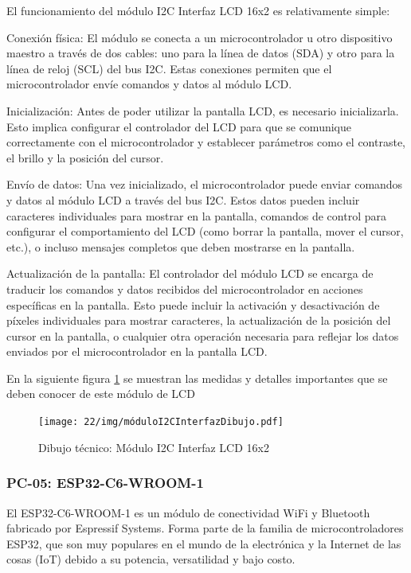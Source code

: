 El funcionamiento del módulo I2C Interfaz LCD 16x2 es relativamente simple:

Conexión física: El módulo se conecta a un microcontrolador u otro dispositivo maestro a través de dos cables: uno para la línea de datos (SDA) y otro para la línea de reloj (SCL) del bus I2C. Estas conexiones permiten que el microcontrolador envíe comandos y datos al módulo LCD.

Inicialización: Antes de poder utilizar la pantalla LCD, es necesario inicializarla. Esto implica configurar el controlador del LCD para que se comunique correctamente con el microcontrolador y establecer parámetros como el contraste, el brillo y la posición del cursor.

Envío de datos: Una vez inicializado, el microcontrolador puede enviar comandos y datos al módulo LCD a través del bus I2C. Estos datos pueden incluir caracteres individuales para mostrar en la pantalla, comandos de control para configurar el comportamiento del LCD (como borrar la pantalla, mover el cursor, etc.), o incluso mensajes completos que deben mostrarse en la pantalla.

Actualización de la pantalla: El controlador del módulo LCD se encarga de traducir los comandos y datos recibidos del microcontrolador en acciones específicas en la pantalla. Esto puede incluir la activación y desactivación de píxeles individuales para mostrar caracteres, la actualización de la posición del cursor en la pantalla, o cualquier otra operación necesaria para reflejar los datos enviados por el microcontrolador en la pantalla LCD.

En la siguiente figura \ref{fig:modulo} se muestran las medidas y detalles importantes que se deben conocer de este módulo de LCD
\begin{figure}[H]
    \centering
    \texttt{[image: 22/img/móduloI2CInterfazDibujo.pdf]}
    \caption{Dibujo técnico: Módulo I2C Interfaz LCD 16x2}
    \label{fig:modulo}
\end{figure}


\subsubsection{PC-05: ESP32-C6-WROOM-1 }

El ESP32-C6-WROOM-1 es un módulo de conectividad WiFi y Bluetooth fabricado por Espressif Systems. Forma parte de la familia de microcontroladores ESP32, que son muy populares en el mundo de la electrónica y la Internet de las cosas (IoT) debido a su potencia, versatilidad y bajo costo.

